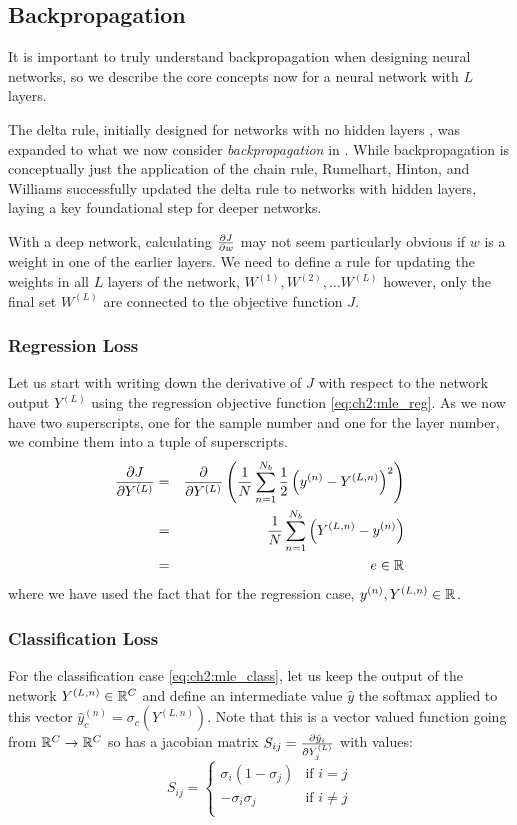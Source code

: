 \subsection{Backpropagation}
It is important to truly understand backpropagation when designing neural
networks, so we describe the core concepts now for a neural network with
$L$ layers.

The delta rule, initially designed for networks with no hidden layers 
\cite{widrow_neurocomputing:_1988}, was expanded to what we now consider
\emph{backpropagation} in \cite{rumelhart_parallel_1986}. While backpropagation
is conceptually just the application of the chain rule, Rumelhart, Hinton, and
Williams successfully updated the delta rule to networks with hidden layers,
laying a key foundational step for deeper networks. 

With a deep network, calculating $\dydx{J}{w}$ may not seem
particularly obvious if $w$ is a weight in one of the earlier layers. We need
to define a rule for updating the weights in all $L$ layers of the network,
$W^{(1)}, W^{(2)}, \ldots W^{(L)}$ however, only the final set $W^{(L)}$ are
connected to the objective function $J$. 

\subsubsection{Regression Loss}
Let us start with writing down the derivative of $J$ with respect to the network
output $Y^{(L)}$ using the regression objective function \eqref{eq:ch2:mle_reg}. 
As we now have two superscripts,
one for the sample number and one for the layer number, we combine them into a
tuple of superscripts. 
\begin{eqnarray}
  \dydx{J}{Y^{(L)}} &= & \dydx{}{Y^{(L)}} \left( \frac{1}{N}\sum_{n=1}^{N_b}\frac{1}{2} \left(y^{(n)} - Y^{(L, n)}\right)^2\right) \\
                    &=& \frac{1}{N}\sum_{n=1}^{N_b} \left(Y^{(L, n)} - y^{(n)} \right) \\
                    &=& e \in \reals \label{eq:ch2:reg_b1}
\end{eqnarray}
where we have used the fact that for the regression case, $y^{(n)}, Y^{(L,n)}
\in \reals$. 

\subsubsection{Classification Loss}
For the classification case \eqref{eq:ch2:mle_class}, let us keep the output of
the network $Y^{(L,n)} \in \reals[C]$ and define an intermediate value $\hat{y}$ the
softmax applied to this vector $\hat{y}^{(n)}_c = \sigma_c\left(Y^{(L, n)}\right)$.
Note that this is a vector valued function going from $\reals[C] \rightarrow
\reals[C]$ so has a jacobian matrix $S_{ij} = \dydx{\hat{y}_i}{Y^{(L)}_j}$ with
values:
\begin{equation}
  S_{ij} = \begin{cases}
    \sigma_i (1-\sigma_j) & \text{if $i=j$}\\
    -\sigma_i \sigma_j & \text{if $i\neq j$}\\
  \end{cases}
\end{equation}

